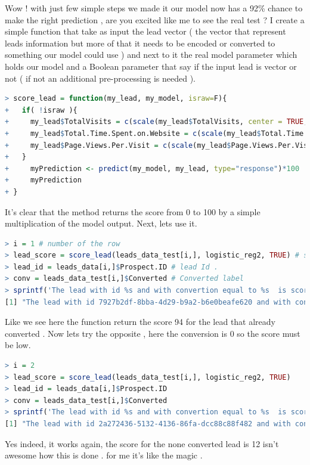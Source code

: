 Wow ! with just few simple steps we made it our model now has a 92\% chance to make the right prediction , are you excited like me to see the real test ?
I create a simple function that take as input the lead vector ( the vector that represent leads information but more of that it needs to be encoded or converted to something our model could use ) and next to it the real model parameter which holds our model and a Boolean parameter that say if the input lead is vector or not ( if not an additional pre-processing is needed ). 
\begin{lstlisting}[language=R]
> score_lead = function(my_lead, my_model, israw=F){
+   if( !israw ){
+     my_lead$TotalVisits = c(scale(my_lead$TotalVisits, center = TRUE, scale = TRUE))
+     my_lead$Total.Time.Spent.on.Website = c(scale(my_lead$Total.Time.Spent.on.Website, center = TRUE, scale = TRUE))
+     my_lead$Page.Views.Per.Visit = c(scale(my_lead$Page.Views.Per.Visit, center = TRUE, scale = TRUE))
+   }
+     myPrediction <- predict(my_model, my_lead, type="response")*100
+     myPrediction
+ }
\end{lstlisting}
It's clear that the method returns the score from 0 to 100 by a simple multiplication of the model output.
Next, lets use it. 
\begin{lstlisting}[language=R]
> i = 1 # number of the row
> lead_score = score_lead(leads_data_test[i,], logistic_reg2, TRUE) # score the lead 
> lead_id = leads_data[i,]$Prospect.ID # lead Id .
> conv = leads_data_test[i,]$Converted # Converted label 
> sprintf('The lead with id %s and with convertion equal to %s  is scored by the model as %.2f percent', lead_id, conv,lead_score[1])
[1] "The lead with id 7927b2df-8bba-4d29-b9a2-b6e0beafe620 and with convertion equal to 1  is scored by the model as 94.28 percent"
\end{lstlisting}
Like we see here the function return the score 94 for the lead that already converted . Now lets try the opposite ,  here the conversion is 0 so the score must be low.
\begin{lstlisting}[language=R]
> i = 2
> lead_score = score_lead(leads_data_test[i,], logistic_reg2, TRUE)
> lead_id = leads_data[i,]$Prospect.ID
> conv = leads_data_test[i,]$Converted
> sprintf('The lead with id %s and with convertion equal to %s  is scored by the model as %.2f percent', lead_id, conv,lead_score[1])
[1] "The lead with id 2a272436-5132-4136-86fa-dcc88c88f482 and with convertion equal to 0  is scored by the model as 12.64 percent"
\end{lstlisting}
Yes indeed, it works again, the score for the none converted lead is 12 isn't awesome how this is done . for me it's like the magic .



\begin{lstlisting}[language=R]

\end{lstlisting}



 
